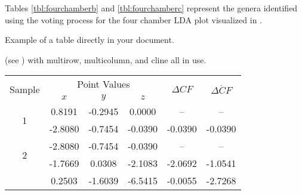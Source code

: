   \begin{table}[!htb]
      \raggedright
      Tables \ref{tbl:fourchamberb} and \ref{tbl:fourchamberc} represent the genera identified using the voting process for the four chamber LDA plot visualized in .
      \begin{minipage}{.5\linewidth}
        \centering
        \label{tbl:fourchamberb}
      \end{minipage}%
      \begin{minipage}{.5\linewidth}
        \centering
        \label{tbl:fourchamberc}
      \end{minipage}
  \end{table}


Example of a table directly in your document.

(see ) with multirow, multicolumn, and cline all in use.
\begin{table}[h!]
\begin{center}
\begin{tabular}{|c||c|c|c||c|c|}
\hline
\multirow{2}{*}{Sample} & \multicolumn{3}{|c||}{Point Values} & \multirow{2}{*}{${\Delta}CF$}& \multirow{2}{*}{$\overline{{\Delta}CF}$} \\ \cline{2-4}
& $x$ & $y$ & $z$ &  & \\ \hline
\multirow{2}{*}{1} & 0.8191 & -0.2945 & 0.0000 & -- & -- \\ \cline{2-6}
 & -2.8080 & -0.7454 & -0.0390 & -0.0390 & -0.0390 \\ \hline 
\multirow{2}{*}{2} & -2.8080 & -0.7454 & -0.0390 & -- & -- \\ \cline{2-6}
 & -1.7669 & 0.0308 & -2.1083 & -2.0692 & -1.0541 \\ \hline 
 & 0.2503 & -1.6039 & -6.5415 & -0.0055 & -2.7268 \\ \hline
 \end{tabular}
\label{tbl:tbl_1}
\end{center}
\end{table}

